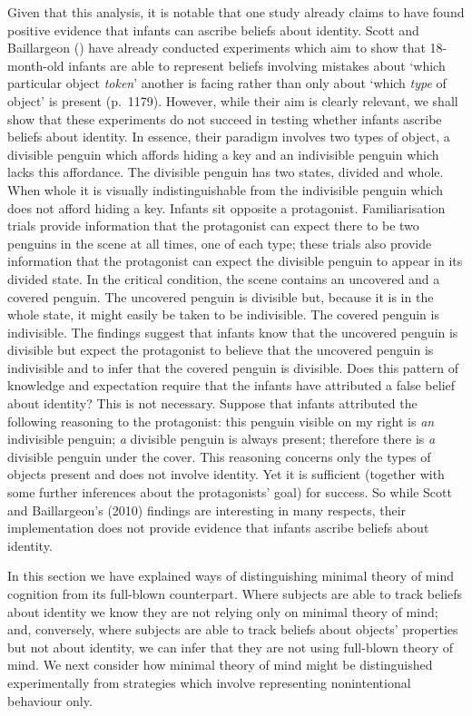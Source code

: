 \documentclass[12pt,\papersize]{extarticle}
\begin{document}
Given that this analysis, it is notable that one study already claims to have found positive evidence that infants can ascribe beliefs about identity. 
Scott and Baillargeon (\citeyear{en_1690}) have already conducted experiments which aim to show that 18-month-old infants are able to represent beliefs involving mistakes about `which particular object \textit{token}' another is facing rather than only about `which \textit{type} of object' is present (p.\ 1179). However, while their aim is clearly relevant, we shall show that these experiments do not succeed in testing whether infants ascribe beliefs about identity.  In essence, their paradigm involves two types of object, a divisible penguin which affords hiding a key and an indivisible penguin which lacks this affordance.  The divisible penguin has two states, divided and whole.  When whole it is visually indistinguishable from the indivisible penguin which does not afford hiding a key.  Infants sit opposite a protagonist.  Familiarisation trials provide information that the protagonist can expect there to be two penguins in the scene at all times, one of each type; these trials also provide information that the protagonist can expect the divisible penguin to appear in its divided state. In the critical condition, the scene contains an uncovered and a covered penguin. The uncovered penguin is divisible but, because it is in the whole state, it might easily be taken to be indivisible.  The covered penguin is indivisible.  The findings suggest that infants know that the uncovered penguin is divisible but expect the protagonist to believe that the uncovered penguin is indivisible and to infer that the covered penguin is divisible.  Does this pattern of knowledge and expectation require that the infants have attributed a false belief about identity?  This is not necessary. Suppose that infants attributed the following reasoning to the protagonist: this penguin visible on my right is \textit{an} indivisible penguin; \textit{a} divisible penguin is always present; therefore there is \textit{a} divisible penguin under the cover.  This reasoning concerns only the types of objects present and does not involve identity. Yet it is sufficient (together with some further inferences about the protagonists’ goal) for success. So while Scott and Baillargeon’s (2010) findings are interesting in many respects, their implementation does not provide evidence that infants ascribe beliefs about identity.

In this section we have explained ways of distinguishing minimal theory of mind cognition from its full-blown counterpart.  Where subjects are able to track beliefs about identity we know they are not relying only on minimal theory of mind; and, conversely, where subjects are able to track beliefs about objects’ properties but not about identity, we can infer that they are not using full-blown theory of mind.  We next consider how  minimal theory of mind might be distinguished experimentally from strategies which involve representing nonintentional behaviour only.
	
\end{document}
